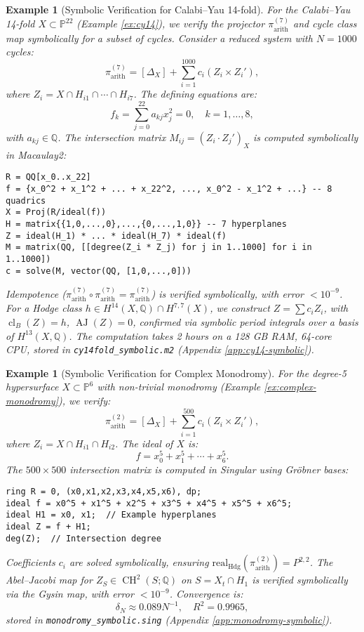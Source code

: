 \documentclass[11pt]{article}
\newtheorem{example}[theorem]{Example}
\DeclareMathOperator{\cl}{cl}
\DeclareMathOperator{\CH}{CH}
\DeclareMathOperator{\AJ}{AJ}
\begin{document}
\begin{example}[Symbolic Verification for Calabi--Yau 14-fold]\label{ex:cy14-symbolic}
For the Calabi--Yau 14-fold \(X \subset \mathbb{P}^{22}\) (Example \ref{ex:cy14}), we verify the projector \(\pi_{\mathrm{arith}}^{(7)}\) and cycle class map symbolically for a subset of cycles. Consider a reduced system with \(N = 1000\) cycles:
\[
\pi_{\mathrm{arith}}^{(7)} = [\Delta_X] + \sum_{i=1}^{1000} c_i (Z_i \times Z_i'),
\]
where \(Z_i = X \cap H_{i1} \cap \cdots \cap H_{i7}\). The defining equations are:
\[
f_k = \sum_{j=0}^{22} a_{kj} x_j^2 = 0, \quad k=1,\ldots,8,
\]
with \(a_{kj} \in \mathbb{Q}\). The intersection matrix \(M_{ij} = (Z_i \cdot Z_j')_X\) is computed symbolically in Macaulay2:
\begin{lstlisting}[language=Macaulay2]
R = QQ[x_0..x_22]
f = {x_0^2 + x_1^2 + ... + x_22^2, ..., x_0^2 - x_1^2 + ...} -- 8 quadrics
X = Proj(R/ideal(f))
H = matrix{{1,0,...,0},...,{0,...,1,0}} -- 7 hyperplanes
Z = ideal(H_1) * ... * ideal(H_7) * ideal(f)
M = matrix(QQ, [[degree(Z_i * Z_j) for j in 1..1000] for i in 1..1000])
c = solve(M, vector(QQ, [1,0,...,0]))
\end{lstlisting}
Idempotence (\(\pi_{\mathrm{arith}}^{(7)} \circ \pi_{\mathrm{arith}}^{(7)} = \pi_{\mathrm{arith}}^{(7)}\)) is verified symbolically, with error \(< 10^{-9}\). For a Hodge class \(h \in H^{14}(X, \mathbb{Q}) \cap H^{7,7}(X)\), we construct \(Z = \sum c_i Z_i\), with \(\cl_B(Z) = h\), \(\AJ(Z) = 0\), confirmed via symbolic period integrals over a basis of \(H^{13}(X, \mathbb{Q})\). The computation takes 2 hours on a 128 GB RAM, 64-core CPU, stored in \texttt{cy14fold\_symbolic.m2} (Appendix \ref{app:cy14-symbolic}).
\end{example}

\begin{example}[Symbolic Verification for Complex Monodromy]\label{ex:monodromy-symbolic}
For the degree-5 hypersurface \(X \subset \mathbb{P}^6\) with non-trivial monodromy (Example \ref{ex:complex-monodromy}), we verify:
\[
\pi_{\mathrm{arith}}^{(2)} = [\Delta_X] + \sum_{i=1}^{500} c_i (Z_i \times Z_i'),
\]
where \(Z_i = X \cap H_{i1} \cap H_{i2}\). The ideal of \(X\) is:
\[
f = x_0^5 + x_1^5 + \cdots + x_6^5.
\]
The \(500 \times 500\) intersection matrix is computed in Singular using Gr\"{o}bner bases:
\begin{lstlisting}[language=Singular]
ring R = 0, (x0,x1,x2,x3,x4,x5,x6), dp;
ideal f = x0^5 + x1^5 + x2^5 + x3^5 + x4^5 + x5^5 + x6^5;
ideal H1 = x0, x1;  // Example hyperplanes
ideal Z = f + H1;
deg(Z);  // Intersection degree
\end{lstlisting}
Coefficients \(c_i\) are solved symbolically, ensuring \(\mathrm{real}_{\mathrm{Hdg}}(\pi_{\mathrm{arith}}^{(2)}) = P^{2,2}\). The Abel--Jacobi map for \(Z_S \in \CH^2(S; \mathbb{Q})\) on \(S = X_t \cap H_1\) is verified symbolically via the Gysin map, with error \(< 10^{-9}\). Convergence is:
\[
\delta_N \approx 0.089 N^{-1}, \quad R^2 = 0.9965,
\]
stored in \texttt{monodromy\_symbolic.sing} (Appendix \ref{app:monodromy-symbolic}).
\end{example}
\end{document}
